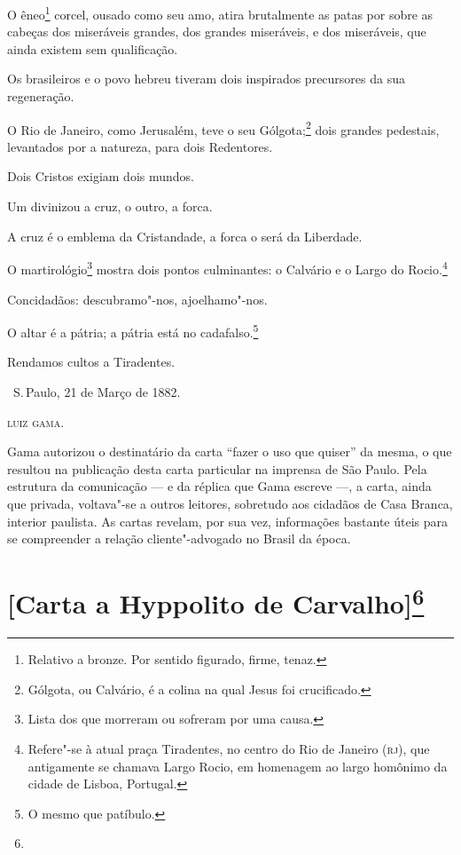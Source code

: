 O êneo\footnote{Relativo a bronze. Por sentido figurado, firme, tenaz.}
corcel, ousado como seu amo, atira brutalmente as patas por sobre as
cabeças dos miseráveis grandes, dos grandes miseráveis, e dos
miseráveis, que ainda existem sem qualificação.

Os brasileiros e o povo hebreu tiveram dois inspirados precursores da
sua regeneração.

O Rio de Janeiro, como Jerusalém, teve o seu Gólgota;\footnote{Gólgota,
  ou Calvário, é a colina na qual Jesus foi crucificado.} dois grandes
pedestais, levantados por a natureza, para dois Redentores.

Dois Cristos exigiam dois mundos.

Um divinizou a cruz, o outro, a forca.

A cruz é o emblema da Cristandade, a forca o será da Liberdade.

O martirológio\footnote{Lista dos que morreram ou sofreram por uma
  causa.} mostra dois pontos culminantes: o Calvário e o Largo do
Rocio.\footnote{Refere"-se à atual praça Tiradentes, no centro do Rio
  de Janeiro (\textsc{rj}), que antigamente se chamava Largo Rocio, em
  homenagem ao largo homônimo da cidade de Lisboa, Portugal.}

Concidadãos: descubramo"-nos, ajoelhamo"-nos.

O altar é a pátria; a pátria está no cadafalso.\footnote{O mesmo que
  patíbulo.}

Rendamos cultos a Tiradentes.

\bigskip

\hfill\ S.\,Paulo, 21 de Março de 1882.\smallskip

\hfill\textsc{luiz gama.}

\pagebreak
\mbox{}\vfill
\thispagestyle{empty}

{\small\noindent
Gama autorizou o destinatário da carta ``fazer o uso que quiser'' da
mesma, o que resultou na publicação desta carta particular na imprensa
de São Paulo. Pela estrutura da comunicação --- e da réplica que Gama
escreve ---, a carta, ainda que privada, voltava"-se a outros leitores,
sobretudo aos cidadãos de Casa Branca, interior paulista. As cartas
revelam, por sua vez, informações bastante úteis para se compreender a
relação cliente"-advogado no Brasil da época.}

\chapter{{[}Carta a Hyppolito de Carvalho{]}\footnote[*]{}}

